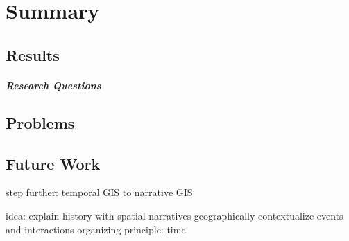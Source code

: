 
\chapter{Summary} %
\label{cha:summary}


\section{Results} %
\label{sec:results}



\paragraph{Research Questions} %
\label{par:result_research_questions}



\section{Problems} %
\label{sec:problems}




\section{Future Work} %
\label{sec:future_work}

step further: temporal GIS to narrative GIS

idea: explain history with spatial narratives
  geographically contextualize events and interactions
  organizing principle: time





